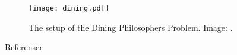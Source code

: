 \documentclass{beamer}
\begin{document}
\begin{frame}{\insertsubsectionhead}
  \begin{figure}
    \texttt{[image: dining.pdf]}
    \caption{The setup of the Dining Philosophers Problem.
      Image: \cite{Silberschatz2013osc}.}
  \end{figure}
\end{frame}




\begin{frame}[allowframebreaks]{Referenser}
  \small
  \printbibliography
\end{frame}
\end{document}
